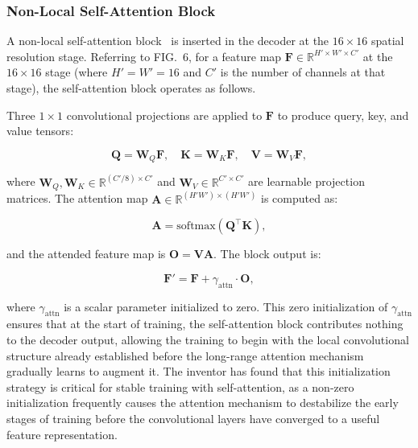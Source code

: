 \documentclass[12pt,letterpaper]{article}
\newcommand{\RR}{\mathbb{R}}
\begin{document}
\subsubsection{Non-Local Self-Attention Block}

A non-local self-attention block~\cite{zhang2019,wang2018} is inserted in the
decoder at the $16 \times 16$ spatial resolution stage. Referring to FIG.\ 6,
for a feature map $\mathbf{F} \in \RR^{H' \times W' \times C'}$ at the
$16 \times 16$ stage (where $H' = W' = 16$ and $C'$ is the number of channels
at that stage), the self-attention block operates as follows.

Three $1 \times 1$ convolutional projections are applied to $\mathbf{F}$ to
produce query, key, and value tensors:

\begin{equation}
  \mathbf{Q} = \mathbf{W}_Q \mathbf{F}, \quad
  \mathbf{K} = \mathbf{W}_K \mathbf{F}, \quad
  \mathbf{V} = \mathbf{W}_V \mathbf{F},
  \label{eq:qkv}
\end{equation}

\noindent where $\mathbf{W}_Q, \mathbf{W}_K \in \RR^{(C'/8) \times C'}$ and
$\mathbf{W}_V \in \RR^{C' \times C'}$ are learnable projection matrices.
The attention map $\mathbf{A} \in \RR^{(H'W') \times (H'W')}$ is computed as:

\begin{equation}
  \mathbf{A} = \text{softmax}\!\left(\mathbf{Q}^\top \mathbf{K}\right),
  \label{eq:attn}
\end{equation}

\noindent and the attended feature map is $\mathbf{O} = \mathbf{V}\mathbf{A}$.
The block output is:

\begin{equation}
  \mathbf{F}' = \mathbf{F} + \gamma_{\text{attn}} \cdot \mathbf{O},
  \label{eq:attn_out}
\end{equation}

\noindent where $\gamma_{\text{attn}}$ is a scalar parameter initialized to
zero. This zero initialization of $\gamma_{\text{attn}}$ ensures that at the
start of training, the self-attention block contributes nothing to the decoder
output, allowing the training to begin with the local convolutional structure
already established before the long-range attention mechanism gradually learns
to augment it. The inventor has found that this initialization strategy is
critical for stable training with self-attention, as a non-zero initialization
frequently causes the attention mechanism to destabilize the early stages of
training before the convolutional layers have converged to a useful feature
representation.
\end{document}
